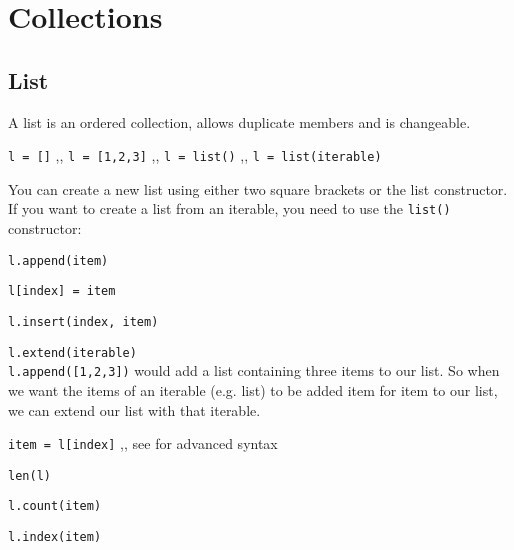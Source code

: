 \section{Collections}

  \subsection{List} \label{List}
    A list is an ordered collection, allows duplicate members and is changeable.

    \begin{itemize}
       \texttt{l = []} \sep{,} \texttt{l = [1,2,3]} \sep{,}
      \texttt{l = list()} \sep{,} \texttt{l = list(iterable)}

      You can create a new list using either two square brackets or the list constructor.
      If you want to create a list from an iterable, you need to use the
      \texttt{list()} constructor:


       \texttt{l.append(item)}

       \texttt{l[index] = item}

       \texttt{l.insert(index, item)}

       \texttt{l.extend(iterable)} \\
      \texttt{l.append([1,2,3])} would add a list containing three items to our list.
      So when we want the items of an iterable (e.g. list) to be added item for item to our list,
      we can extend our list with that iterable.


       \texttt{item = l[index]} \sep{,}
      see  for advanced syntax

       \texttt{len(l)}

       \texttt{l.count(item)}

       \texttt{l.index(item)}


\end{itemize}
